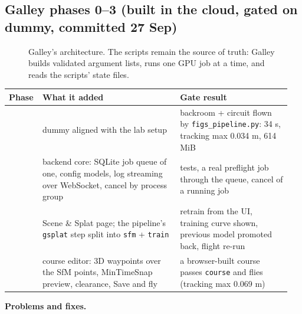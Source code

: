 \documentclass[11pt,a4paper]{article}
\newcommand{\code}[1]{\texttt{#1}}
\begin{document}
\subsection{Galley phases 0–3 (built in the cloud, gated on dummy, committed 27 Sep)}
\begin{figure}[ht]
\centering
{}
\caption{Galley's architecture. The scripts remain the source of truth: Galley builds validated argument lists, runs one
GPU job at a time, and reads the scripts' state files.}
\end{figure}

\begin{center}\small
\begin{tabular}{@{}>{\raggedright\arraybackslash}p{0.096\linewidth}>{\raggedright\arraybackslash}p{0.472\linewidth}>{\raggedright\arraybackslash}p{0.380\linewidth}@{}}
\toprule
\textbf{Phase} & \textbf{What it added} & \textbf{Gate result} \\
\midrule
0 & dummy aligned with the lab setup & backroom + circuit flown by \code{figs\_\allowbreak{}pipeline.py}: 34 s, tracking max 0.034 m, 614 MiB \\
1 & backend core: SQLite job queue of one, config models, log streaming over WebSocket, cancel by process group & 26 tests, a real preflight job through the queue, cancel of a running job \\
2 & Scene \& Splat page; the pipeline's \code{gsplat} step split into \code{sfm} + \code{train} & retrain from the UI, training curve shown, previous model promoted back, flight re-run \\
3 & course editor: 3D waypoints over the SfM points, MinTimeSnap preview, clearance, Save and fly & a browser-built course passes \code{course} and flies (tracking max 0.069 m) \\
\bottomrule
\end{tabular}
\end{center}
\textbf{Problems and fixes.}
\end{document}
